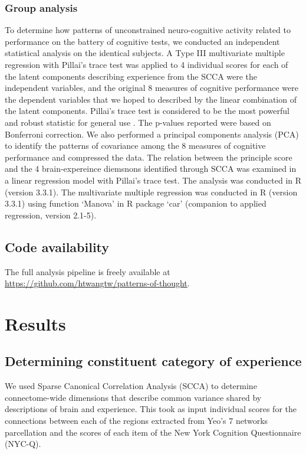 \subsubsection{Group analysis}
\label{study2:method:manova}
To determine how patterns of unconstrained neuro-cognitive activity related to performance on the battery of cognitive tests, we conducted an independent statistical analysis on the identical subjects. A Type III multivariate multiple regression with Pillai’s trace test was applied to 4 individual scores for each of the latent components describing experience from the SCCA  were the independent variables, and the original 8 measures of cognitive performance were the dependent variables that we hoped to described by the linear combination of the latent components. Pillai’s trace test is considered to be the most powerful and robust statistic for general use \cite{Huberty2006}.%
The p-values reported were based on Bonferroni correction. We also performed a principal components analysis (PCA) to identify the patterns of covariance among the 8 measures of cognitive performance and compressed the data. The relation between the principle score and the 4 brain-expereince diemsnons identified through SCCA was examined in a linear regression model with Pillai’s trace test. The analysis was conducted in R (version 3.3.1).  The multivariate multiple regression was conducted in R (version 3.3.1) using function ‘Manova’ in R package ‘car’ (companion to applied regression, version 2.1-5).

\subsection{Code availability}
\label{study2:method:code}
The full analysis pipeline is freely available at \url{https://github.com/htwangtw/patterns-of-thought}.


\section{Results}
\label{study2:results}

\subsection{Determining constituent category of experience}
\label{study2:results:cca}
We used Sparse Canonical Correlation Analysis (SCCA) to determine connectome-wide dimensions that describe common variance shared by descriptions of brain and experience. This took as input individual scores for the connections between each of the regions extracted from Yeo’s 7 networks parcellation and the scores of each item of the New York Cognition Questionnaire (NYC-Q).

